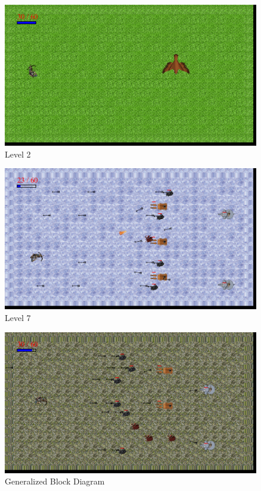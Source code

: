 \newpage
\begin{figure}[h]
	
	\centering
	\includegraphics[width = \textwidth]{sec/pdf/level2}
	\caption{Level 2}
\end{figure}
\vspace{2cm}
\begin{figure}[h]
	
	\centering
	\includegraphics[width = \textwidth]{sec/pdf/level 7}
	\caption{Level 7}
\end{figure}
\newpage
\vspace{2cm}
\begin{figure}[h]
	
	\centering
	\includegraphics[width = \textwidth]{sec/pdf/level 8}
	\caption{Generalized Block Diagram}
\end{figure}

